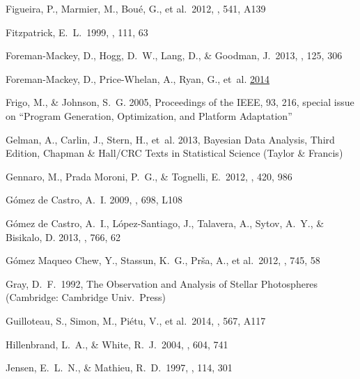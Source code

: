 \documentclass{aastex6}
\begin{document}
\begin{thebibliography}{}
 Figueira, P., Marmier, M., Bou{\'e}, G., et al.\ 2012, \aap, 541, A139 

 Fitzpatrick, E.~L.\ 1999, 
\pasp, 111, 63 

 Foreman-Mackey, D., Hogg, D.~W., Lang, D., \& Goodman, J.\ 2013, \pasp, 125, 306

Foreman-Mackey, D., Price-Whelan, A., Ryan, G., {et~al.}
  \href{http://dx.doi.org/10.5281/zenodo.10598}{2014}

Frigo, M., \& Johnson, S.~G. 2005, Proceedings of the IEEE, 93,
  216, special issue on ``Program Generation, Optimization, and Platform
  Adaptation''

Gelman, A., Carlin, J., Stern, H., {et~al.} 2013, {Bayesian Data Analysis,
  Third Edition}, {Chapman \& Hall/CRC Texts in Statistical Science} (Taylor \&
  Francis)

 Gennaro, M., Prada Moroni, P.~G., \& Tognelli, E.\ 2012, \mnras, 420, 986

 G{\'o}mez de Castro, A.~I. 2009, \apj, 698, L108

 G{\'o}mez de Castro, A.~I., L{\'o}pez-Santiago, J., Talavera, A., Sytov, A.~Y., \& Bisikalo, D. 2013, \apj, 766, 62

 G{\'o}mez 
Maqueo Chew, Y., Stassun, K.~G., Pr{\v s}a, A., et al.\ 2012, \apj, 745, 58

 Gray, D.~F.\ 1992, The Observation and Analysis of Stellar Photospheres (Cambridge: Cambridge Univ.~Press)

 Guilloteau, S., Simon, M., Pi{\'e}tu, V., et al.\ 2014, \aap, 567, A117 
  
 Hillenbrand, L.~A., \& White, R.~J.\ 2004, \apj, 604, 741
  
 Jensen, E.~L.~N., \& Mathieu, R.~D.\ 1997, \aj, 114, 301 


\end{thebibliography}
\end{document}
